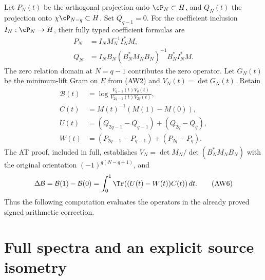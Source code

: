 \documentclass[10pt,a4paper,oneside]{report}
\begin{document}
Let $P_N(t)$ be the orthogonal projection onto $\cP_N\subset H$,
and $Q_N(t)$ the projection onto $\chi\cP_{N-q}\subset H$.
Set $Q_{q-1}=0$. For the coefficient inclusion $I_N:\cP_N\to H$,
their fully typed coefficient formulas are
\[
 \begin{aligned}
 P_N&=I_NM_N^{-1}I_N^*M,\\
 Q_N&=I_NB_N(B_N^*M_NB_N)^{-1}B_N^*I_N^*M.
 \end{aligned}
 \tag{AW4}
\]
The zero relation domain at $N=q-1$ contributes the zero operator.
Let $G_N(t)$ be the minimum-lift Gram on $E$ from (AW2) and
$V_N(t)=\det G_N(t)$. Retain
\[
 \begin{aligned}
 \mathcal B(t)&=\log\frac{V_{q-1}(t)V_q(t)}
                              {V_{2q-1}(t)V_{2q}(t)},\\
 C(t)&=M(t)^{-1}(M(1)-M(0)),\\
 U(t)&=(Q_{2q-1}-Q_{q-1})+(Q_{2q}-Q_q),\\
 W(t)&=(P_{2q-1}-P_{q-1})+(P_{2q}-P_q).
 \end{aligned}
 \tag{AW5}
\]
The AT proof, included in full, establishes
$V_N=\det M_N/\det(B_N^*M_NB_N)$ with the original orientation
$(-1)^{q(N-q+1)}$, and
\[
 \Delta\mathcal B=\mathcal B(1)-\mathcal B(0)
       =\int_0^1\Tr((U(t)-W(t))C(t))\,dt.
 \tag{AW6}
\]
Thus the following computation evaluates the operators in the
already proved signed arithmetic correction.

\section{Full spectra and an explicit source isometry}
\end{document}
